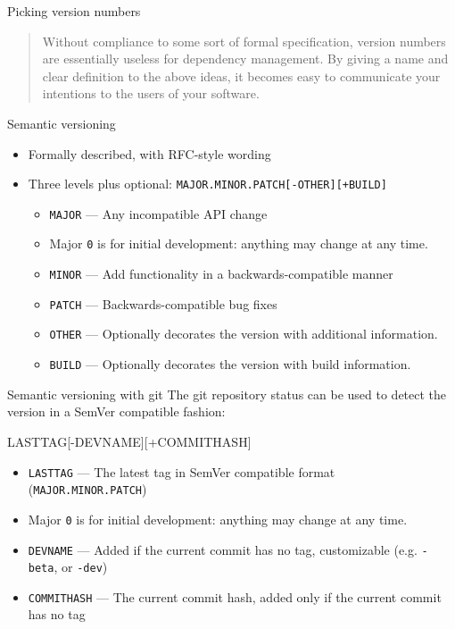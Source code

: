 \documentclass[presentation]{beamer}
\begin{document}
\begin{frame}[fragile]{Picking version numbers}
	\begin{quote}
		Without compliance to some sort of formal specification, version numbers are essentially useless for dependency management. By giving a name and clear definition to the above ideas, it becomes easy to communicate your intentions to the users of your software.
		\begin{flushright}
		\end{flushright}
	\end{quote}
	\begin{block}{Semantic versioning}
		\begin{itemize}
			\item Formally described, with RFC-style wording
			\item Three levels plus optional: \texttt{MAJOR.MINOR.PATCH[-OTHER][+BUILD]}
			\begin{itemize}
				\item \texttt{MAJOR} --- Any incompatible API change
				\item Major \texttt{0} is for initial development: anything may change at any time.
				\item \texttt{MINOR} --- Add functionality in a backwards-compatible manner
				\item \texttt{PATCH} --- Backwards-compatible bug fixes
				\item \texttt{OTHER} --- Optionally decorates the version with additional information.
				\item \texttt{BUILD} --- Optionally decorates the version with build information.
			\end{itemize}
		\end{itemize}
	\end{block}
\end{frame}

\begin{frame}[fragile]{Semantic versioning with git}
    The git repository status can be used to detect the version in a SemVer compatible fashion:
    \begin{block}{LASTTAG[-DEVNAME][+COMMITHASH]}
        \begin{itemize}
            \item \texttt{LASTTAG} --- The latest tag in SemVer compatible format (\texttt{MAJOR.MINOR.PATCH})
            \item Major \texttt{0} is for initial development: anything may change at any time.
            \item \texttt{DEVNAME} --- Added if the current commit has no tag, customizable (e.g. \texttt{-beta}, or \texttt{-dev})
            \item \texttt{COMMITHASH} --- The current commit hash, added only if the current commit has no tag
        \end{itemize}
    \end{block}
\end{frame}
\end{document}
